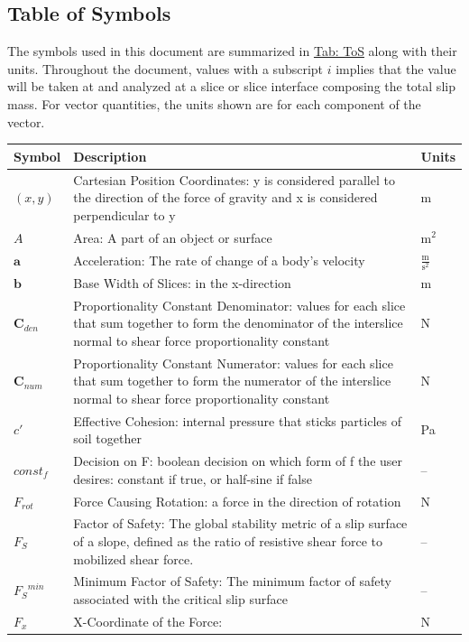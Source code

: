 \documentclass[12pt]{article}
\begin{document}
\subsection{Table of Symbols}
\label{Sec:ToS}
The symbols used in this document are summarized in \hyperref[Table:ToS]{Tab: ToS} along with their units. Throughout the document, values with a subscript $i$ implies that the value will be taken at and analyzed at a slice or slice interface composing the total slip mass. For vector quantities, the units shown are for each component of the vector.
\begin{longtabu}{l X[l] l}
\toprule
\textbf{Symbol} & \textbf{Description} & \textbf{Units}
\\
\midrule
\endhead
$(x,y)$ & Cartesian Position Coordinates: y is considered parallel to the direction of the force of gravity and x is considered perpendicular to y & m
\\
$A$ & Area: A part of an object or surface & $\text{m}^{2}$
\\
$\mathbf{a}$ & Acceleration: The rate of change of a body's velocity & $\frac{\text{m}}{\text{s}^{2}}$
\\
$\mathbf{b}$ & Base Width of Slices: in the x-direction & m
\\
${\mathbf{C}_{den}}$ & Proportionality Constant Denominator: values for each slice that sum together to form the denominator of the interslice normal to shear force proportionality constant & N
\\
${\mathbf{C}_{num}}$ & Proportionality Constant Numerator: values for each slice that sum together to form the numerator of the interslice normal to shear force proportionality constant & N
\\
$c'$ & Effective Cohesion: internal pressure that sticks particles of soil together & Pa
\\
$const_f$ & Decision on F: boolean decision on which form of f the user desires: constant if true, or half-sine if false & --
\\
${F_{rot}}$ & Force Causing Rotation: a force in the direction of rotation & N
\\
${F_{S}}$ & Factor of Safety: The global stability metric of a slip surface of a slope, defined as the ratio of resistive shear force to mobilized shear force. & --
\\
${{F_{S}}^{min}}$ & Minimum Factor of Safety: The minimum factor of safety associated with the critical slip surface & --
\\
${F_{x}}$ & X-Coordinate of the Force:  & N

\end{longtabu}
\end{document}
